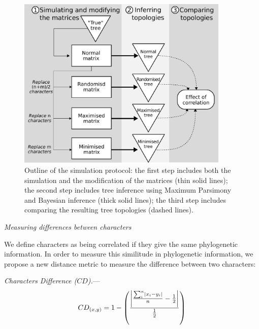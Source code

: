 \documentclass[12pt,letterpaper]{article}
\DeclarePairedDelimiter\abs{\lvert}{\rvert}%
\renewcommand{\subsection}[1]{%
\bigskip
\begin{center}
\begin{large}
\normalfont\itshape #1
\end{large}
\end{center}}
\renewcommand{\subsubsection}[1]{%
\vspace{2ex}
\noindent
\textit{#1.}---}
\begin{document}
\begin{figure}[!htbp]
\centering
   \includegraphics[width=0.9\textwidth]{Figures/outline.pdf}
\caption{Outline of the simulation protocol: the first step includes both the simulation and the modification of the matrices (thin solid lines); the second step includes tree inference using Maximum Parsimony and Bayesian inference (thick solid lines); the third step includes comparing the resulting tree topologies (dashed lines).}
\label{Fig:outline}
\end{figure}

\subsection{Measuring differences between characters}
\label{CD_description}
We define characters as being correlated if they give the same phylogenetic information.
In order to measure this similitude in phylogenetic information, we propose a new distance metric to measure the difference between two characters:

\subsubsection{Characters Difference ($CD$)}
\begin{equation}
    CD_{(x,y)} = 1 - \left(\frac{\abs*{\frac{\sum_{i}^{n}\abs{x_{i} - y_{i}}}{n}-\frac{1}{2}}}{\frac{1}{2}}\right)
\end{equation}
\end{document}
